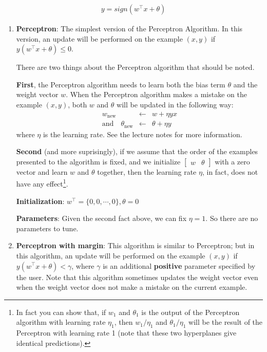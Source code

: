 \begin{align*}
y=sign(w^\intercal x + \theta)
\end{align*}


\begin{enumerate}
\item {\bf Perceptron}: The simplest version of the Perceptron
  Algorithm. In this version, an update will be performed on the
  example $(x,y)$ if $y(w^\intercal x + \theta) \leq 0$.
    
  There are two things about the Perceptron algorithm that should be
  noted.

  {\bf First}, the Perceptron algorithm needs to learn both the bias
  term $\theta$ and the weight vector $w$. When the Perceptron
  algorithm makes a mistake on the example $(x,y)$, both $w$ and
  $\theta$ will be updated in the following way: \begin{eqnarray*}
  w_{\text{new}} & \leftarrow & w + \eta y
  x \\ \text{and} \quad \theta_{\text{new}} & \leftarrow & \theta
  + \eta y \end{eqnarray*} where $\eta$ is the learning rate. See the
  lecture notes for more information.

  {\bf Second} (and more suprisingly), if we assume that the order of the
  examples presented to the algorithm is fixed, and we initialize
  $\begin{bmatrix} w & \theta \end{bmatrix} $ with a zero vector and
  learn $w$ and $\theta$ together, then the learning rate $\eta$, in
  fact, does not have any effect\footnote{In fact you can show that, if $w_1$ and
  $\theta_1$ is the output of the Perceptron algorithm with learning
  rate $\eta_1$, then $w_1/\eta_1$ and $\theta_1/\eta_1$
  will be the result of the Perceptron with learning rate 1 (note that
  these two hyperplanes give identical predictions).}.
  
  {\bf Initialization}: $w^\intercal=\{0,0,\cdots,0\},\theta=0$

  {\bf Parameters}: Given the second fact above, we can fix $\eta=1$. So there are no parameters to tune.

\item {\bf Perceptron with margin}: This algorithm is similar to Perceptron;
  but in this algorithm, an update will be performed on the example
  $(x,y)$ if $y(w^\intercal x + \theta) < \gamma$, where $\gamma$ is
  an additional {\bf positive} parameter specified by the user. Note
  that this algorithm sometimes updates the weight vector even when
  the weight vector does not make a mistake on the current example.


\end{enumerate}
